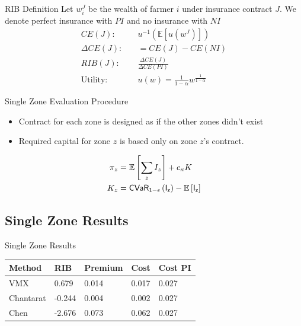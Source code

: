 \documentclass{beamer}
\begin{document}
\begin{frame}{RIB Definition}
    Let $w^J_i$ be the wealth of farmer $i$ under insurance contract $J$. We denote perfect insurance with $PI$ and no insurance with $NI$
    \vspace{4mm}
    \begin{align*}
         CE(J):& \quad u^{-1}(\mathbb{E}[u(w^J)]) \\
         \Delta CE(J):&\quad = CE(J) - CE(NI) \\
         RIB(J):& \quad \frac{\Delta CE(J)}{\Delta CE(PI)} \\
         \text{Utility}:& \quad u(w) = \frac{1}{1-\alpha} w^{\frac{1}{1-\alpha}}
    \end{align*}
    
\end{frame}

\begin{frame}{Single Zone Evaluation Procedure}
    \begin{itemize}
        \setlength\itemsep{2em}
        \item Contract for each zone is designed as if the other zones didn't exist
        \item Required capital for zone $z$ is based only on zone $z$'s contract.  
    \end{itemize}

    \begin{align*}
        \pi_z &= \mathbb{E} \left [ \sum_z I_z \right ] + c_{\kappa} K\\
        K_z &= \sf{CVaR}_{1-\epsilon}\left ( I_z \right ) - \mathbb{E}\left [ I_z \right ]
    \end{align*}
    
\end{frame}

\subsection{Single Zone Results}
\begin{frame}{Single Zone Results}

    \begin{table}[]
        \centering
        \begin{tabular}{lllll}
        \textbf{Method} & \textbf{RIB} & \textbf{Premium} & \textbf{Cost} & \textbf{Cost PI} \\ \hline
        VMX             & 0.679        & 0.014            & 0.017         & 0.027            \\
        Chantarat       & -0.244       & 0.004            & 0.002         & 0.027            \\
        Chen            & -2.676       & 0.073            & 0.062         & 0.027           
        \end{tabular}
        \end{table}
    
\end{frame}
\end{document}
